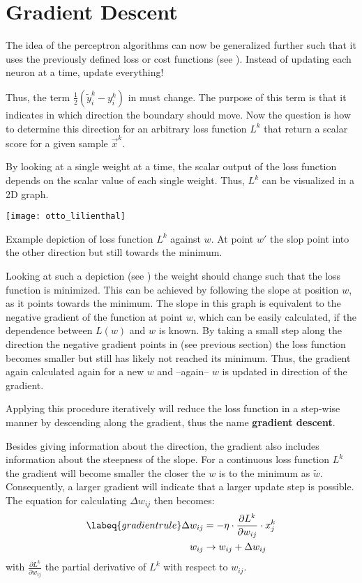 \section{Gradient Descent}
The idea of the perceptron algorithms can now be generalized further such that it uses the previously defined loss or cost functions (see ).
Instead of updating each neuron at a time, update everything!

Thus, the term $\frac{1}{2}(\tilde{y}^k_i - y^k_i)$ in  must change.
The purpose of this term is that it indicates in which direction the boundary should move.
Now the question is how to determine this direction for an arbitrary loss function $L^k$ that return a scalar score for a given sample $\vec{x}^k$.

By looking at a single weight at a time, the scalar output of the loss function depends on the scalar value of each single weight.
Thus, $L^k$ can be visualized in a 2D graph.
\begin{marginfigure}
    \texttt{[image: otto\_lilienthal]}
    \caption[]{Example depiction of loss function $L^k$ against $w$. At point $w'$ the slop point into the other direction but still towards the minimum.}
\end{marginfigure}
Looking at such a depiction (see ) the weight should change such that the loss function is minimized.
This can be achieved by following the slope at position $w$, as it points towards the minimum.
The slope in this graph is equivalent to the negative gradient of the function at point $w$, which can be easily calculated, if the dependence between $L(w)$ and $w$ is known.
By taking a small step along the direction the negative gradient points in (see previous section) the loss function becomes smaller but still has likely not reached its minimum.
Thus, the gradient again calculated again for a new $w$ and --again-- $w$ is updated in direction of the gradient.

Applying this procedure iteratively will reduce the loss function in a step-wise manner by descending along the gradient, thus the name \textbf{gradient descent}.

Besides giving information about the direction, the gradient also includes information about the steepness of the slope.
For a continuous loss function $L^k$ the gradient will become smaller the closer the $w$ is to the minimum as $\tilde{w}$.
Consequently, a larger gradient will indicate that a larger update step is possible.\\
The equation for calculating $\Delta w_{ij}$ then becomes:
\begin{align}
    \labeq{gradientrule}
    \Delta w_{ij} & = - \eta \cdot \frac{\partial L^k}{\partial w_{ij}} \cdot x^k_j \\
    w_{ij} & \rightarrow w_{ij} + \Delta w_{ij}
\end{align}
with $\frac{\partial L^k}{\partial w_{ij}}$ the partial derivative of $L^k$ with respect to $w_{ij}$.

